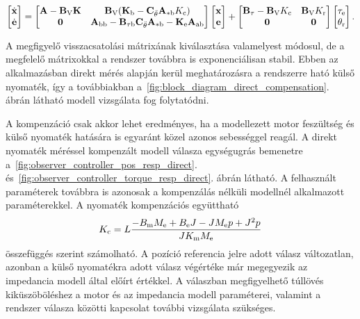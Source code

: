\begin{align}
    \begin{bmatrix}
        \dot{\mathbf{x}} \\
        \dot{\mathbf{e}}
    \end{bmatrix}
    =
    \begin{bmatrix}
        \mathbf{A} - \mathbf{B}_{\mathrm{V}} \mathbf{K} & \mathbf{B}_{\mathrm{V}} (\mathbf{K}_{\mathrm{b}} - \mathbf{C}_{\ddot\theta} \mathbf{A}_{\mathrm{*b}} K_{\mathrm{c}}) \\
        \mathbf{0} & \mathbf{A}_{\mathrm{bb}} - \mathbf{B}_{\mathrm{\tau b}} \mathbf{C}_{\ddot\theta} \mathbf{A}_{\mathrm{*b}} - \mathbf{K}_{\mathrm{e}} \mathbf{A}_{\mathrm{ab}}
    \end{bmatrix}
    \begin{bmatrix}
        \mathbf{x} \\
        \mathbf{e}
    \end{bmatrix}
    +
    \begin{bmatrix}
        \mathbf{B}_{\mathrm{\tau}} - \mathbf{B}_{\mathrm{V}} K_{\mathrm{c}} & \mathbf{B}_{\mathrm{V}} K_{\mathrm{r}}\\
        \mathbf{0} & \mathbf{0}
    \end{bmatrix}
    \begin{bmatrix}
        \tau_{\mathrm{e}} \\
        \theta_{\mathrm{r}}
    \end{bmatrix}.
\end{align}

A megfigyelő visszacsatolási mátrixának kiválasztása valamelyest módosul, de a megfelelő mátrixokkal
a rendszer továbbra is exponenciálisan stabil. Ebben az alkalmazásban direkt mérés alapján kerül meghatározásra
a rendszerre ható külső nyomaték, így a továbbiakban a~\ref{fig:block_diagram_direct_compensation}. ábrán
látható modell vizsgálata fog folytatódni.

A kompenzáció csak akkor lehet eredményes, ha a modellezett motor feszültség és külső nyomaték hatására is 
egyaránt közel azonos sebességgel reagál. A direkt nyomaték méréssel kompenzált modell válasza egységugrás
bemenetre a~\ref{fig:observer_controller_pos_resp_direct}. és~\ref{fig:observer_controller_torque_resp_direct}. ábrán látható. 
A felhasznált paraméterek továbbra is azonosak a kompenzálás nélküli modellnél alkalmazott paraméterekkel.
A nyomaték kompenzációs együttható
\begin{equation}
    K_{\mathrm{c}} = L\frac{- B_{\mathrm{m}} M_{\mathrm{e}} + B_{\mathrm{e}} J - J M_{\mathrm{e}} p + J^2 p}{J K_{\mathrm{m}} M_{\mathrm{e}}}
\end{equation}
összefüggés szerint számolható.
A pozíció referencia jelre adott válasz változatlan, azonban a külső nyomatékra adott válasz végértéke már
megegyezik az impedancia modell által előírt értékkel. A válaszban megfigyelhető túllövés kiküszöböléshez
a motor és az impedancia modell paraméterei, valamint a rendszer válasza közötti kapcsolat további vizsgálata szükséges.

